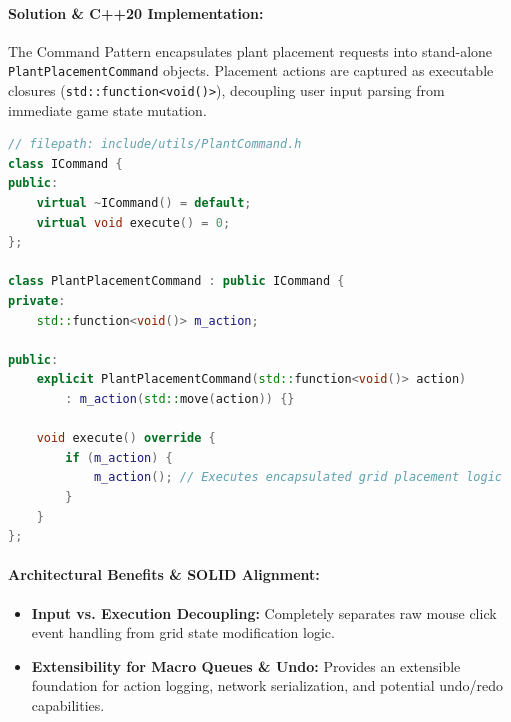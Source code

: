 \documentclass[12pt,a4paper]{article}
\begin{document}
\paragraph{Solution \& C++20 Implementation:}
The Command Pattern encapsulates plant placement requests into stand-alone \texttt{PlantPlacementCommand} objects. Placement actions are captured as executable closures (\texttt{std::function<void()>}), decoupling user input parsing from immediate game state mutation.

\begin{center}
\end{center}

\begin{lstlisting}[language=C++, caption={Command Pattern -- PlantPlacementCommand}]
// filepath: include/utils/PlantCommand.h
class ICommand {
public:
    virtual ~ICommand() = default;
    virtual void execute() = 0;
};

class PlantPlacementCommand : public ICommand {
private:
    std::function<void()> m_action;

public:
    explicit PlantPlacementCommand(std::function<void()> action) 
        : m_action(std::move(action)) {}
        
    void execute() override {
        if (m_action) {
            m_action(); // Executes encapsulated grid placement logic
        }
    }
};
\end{lstlisting}

\paragraph{Architectural Benefits \& SOLID Alignment:}
\begin{itemize}
    \item \textbf{Input vs. Execution Decoupling:} Completely separates raw mouse click event handling from grid state modification logic.
    \item \textbf{Extensibility for Macro Queues \& Undo:} Provides an extensible foundation for action logging, network serialization, and potential undo/redo capabilities.
\end{itemize}
\end{document}

